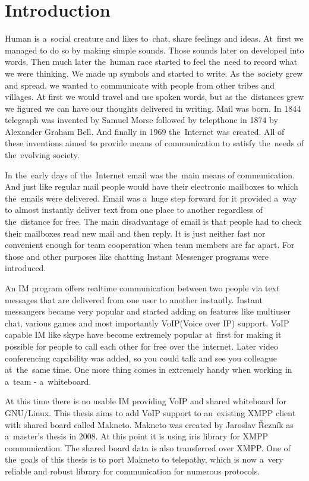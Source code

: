 \linenumbers
\chapter{Introduction}
Human is a~social creature and likes to~chat, share feelings and ideas. At~first we managed to do so by making simple sounds. Those sounds later on developed into words. Then much later the~human race started to feel the~need to record what we were thinking. We made up symbols and started to write. As the~society grew and spread, we wanted to communicate with people from other tribes and villages. At first we would travel and use spoken words, but as the~distances grew we figured we can have our thoughts delivered in writing. Mail was born. In 1844 telegraph was invented by Samuel Morse followed by telepthone in 1874 by Alexander Graham Bell. And finally in 1969 the~Internet was created. All of these inventions aimed to provide means of communication to satisfy the~needs of the~evolving society.  

In the~early days of the~Internet email was the~main means of communication. And just like regular mail people would have their electronic mailboxes to which the~emails were delivered. Email was a~huge step forward for it provided a~way to almost instantly deliver text from one place to another regardless of the~distance for free. The main disadvantage of email is that people had to check their mailboxes read new mail and then reply. It is just neither fast nor convenient enough for team cooperation when team members are far apart. For those and other purposes like chatting Instant Messenger programs were introduced.    

An IM program offers realtime communication between two people via text messages that are delivered from one user to another instantly. Instant messangers became very popular and started adding on features like multiuser chat, various games and most importantly VoIP(Voice over IP) support. VoIP capable IM like skype have become extremely popular at~first for making it possible for people to call each other for free over the~internet. Later video conferencing capability was added, so you could talk and see you colleague at~the~same time. One more thing comes in extremely handy when working in a~team - a~whiteboard.

At this time there is no usable IM providing VoIP and shared whiteboard for GNU/Linux. This thesis aims to add VoIP support to an~existing XMPP client with shared board called Makneto. Makneto was created by Jaroslav Řezník as a~master's thesis in 2008. At this point it is using iris library for XMPP communication. The shared board data is also transferred over XMPP. One of the~goals of this thesis is to port Makneto to telepathy, which is now a~very reliable and robust library for communication for numerous protocols.  

